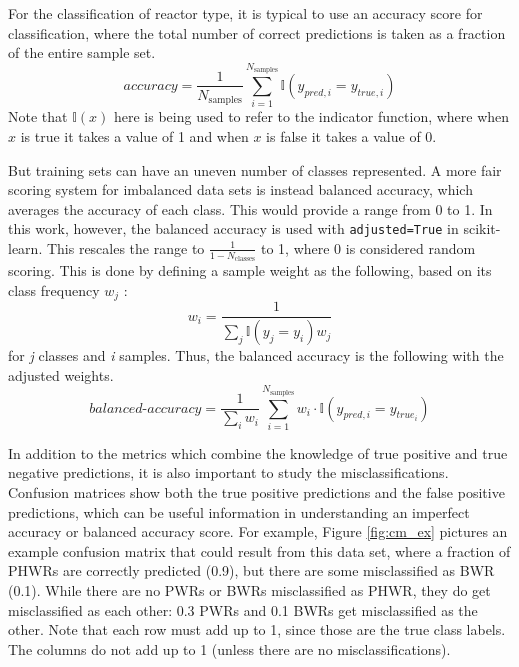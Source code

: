 For the classification of reactor type, it is typical to use an accuracy score
for classification, where the total number of correct predictions is taken as a
fraction of the entire sample set.
\begin{equation}
  \textit{accuracy} = \frac{1}{N_\text{samples}} \sum_{i=1}^{N_\text{samples}} 
                      \mathbb{I}(y_{pred,i} = y_{true,i})
\end{equation}
Note that $\mathbb{I}(x)$ here is being used to refer to the indicator
function, where when $x$ is true it takes a value of 1 and when $x$ is false it
takes a value of 0.

But training sets can have an uneven number of classes represented.  A more
fair scoring system for imbalanced data sets is instead balanced accuracy, which
averages the accuracy of each class. This would provide a range from 0 to 1. In
this work, however, the balanced accuracy is used with \texttt{adjusted=True}
in scikit-learn. This rescales the range to $\frac{1}{1-N_\text{classes}}$ to
1, where 0 is considered random scoring.  This is done by defining a sample
weight as the following, based on its class frequency $w_j$ \cite{scikit}:
\begin{equation}
  w_i = \frac{1}{\sum_j{\mathbb{I}(y_j = y_i) w_j}}
\end{equation}
for \textit{j} classes and \textit{i} samples. Thus, the balanced accuracy is
the following with the adjusted weights.
\begin{equation}
  \textit{balanced-accuracy} = \frac{1}{\sum_{i}{w_i}} \sum_{i=1}^{N_\text{samples}}
                               w_i \cdot \mathbb{I}(y_{pred, i} = y_{true_i})
\end{equation}

In addition to the metrics which combine the knowledge of true positive and
true negative predictions, it is also important to study the
misclassifications. Confusion matrices show both the true positive predictions
and the false positive predictions, which can be useful information in
understanding an imperfect accuracy or balanced accuracy score. For example,
Figure \ref{fig:cm_ex} pictures an example confusion matrix that could result
from this data set, where a fraction of \glspl{PHWR} are correctly predicted
(0.9), but there are some misclassified as \gls{BWR} (0.1).  While there are no
\glspl{PWR} or \glspl{BWR} misclassified as \gls{PHWR}, they do get
misclassified as each other: 0.3 \glspl{PWR} and 0.1 \glspl{BWR} get
misclassified as the other.  Note that each row must add up to 1, since those
are the true class labels. The columns do not add up to 1 (unless there are no
misclassifications).  

